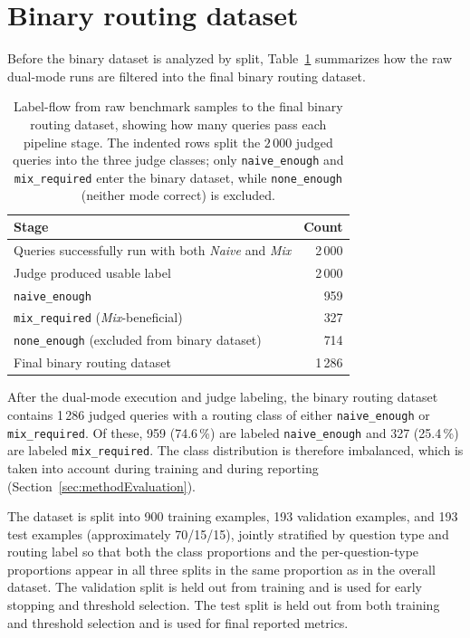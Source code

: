 \documentclass[english, bibtex]{kththesis}               %
\numberwithin{listing}{chapter}
\begin{document}
\section{Binary routing dataset}
\label{sec:methodDataset}

Before the binary dataset is analyzed by split, Table~\ref{tab:datasetFlow} summarizes how the raw dual-mode runs are filtered into the final binary routing dataset.

\begin{table}[!ht]
\begin{center}
\caption{Label-flow from raw benchmark samples to the final binary routing dataset, showing how many queries pass each pipeline stage. The indented rows split the $2\,000$ judged queries into the three judge classes; only \texttt{naive\_enough} and \texttt{mix\_required} enter the binary dataset, while \texttt{none\_enough} (neither mode correct) is excluded.}
\label{tab:datasetFlow}
\begin{tabular}{l|r}
\textbf{Stage} & \textbf{Count} \\
\hline
Queries successfully run with both \emph{Naive} and \emph{Mix} & 2\,000 \\
Judge produced usable label & 2\,000 \\
\quad \texttt{naive\_enough} & 959 \\
\quad \texttt{mix\_required} (\emph{Mix}-beneficial) & 327 \\
\quad \texttt{none\_enough} (excluded from binary dataset) & 714 \\
Final binary routing dataset & 1\,286 \\
\end{tabular}
\end{center}
\end{table}

After the dual-mode execution and judge labeling, the binary routing dataset contains 1\,286 judged queries with a routing class of either \texttt{naive\_enough} or \texttt{mix\_required}. Of these, 959 (74.6\,\%) are labeled \texttt{naive\_enough} and 327 (25.4\,\%) are labeled \texttt{mix\_required}. The class distribution is therefore imbalanced, which is taken into account during training and during reporting (Section~\ref{sec:methodEvaluation}).

The dataset is split into 900 training examples, 193 validation examples, and 193 test examples (approximately 70/15/15), jointly stratified by question type and routing label so that both the class proportions and the per-question-type proportions appear in all three splits in the same proportion as in the overall dataset. The validation split is held out from training and is used for early stopping and threshold selection. The test split is held out from both training and threshold selection and is used for final reported metrics.
\end{document}
